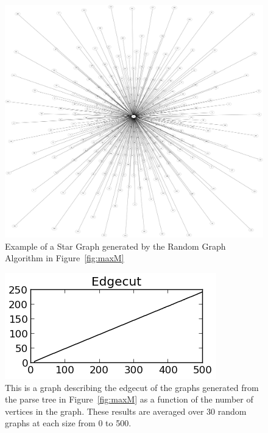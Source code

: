\documentclass{article}
\begin{document}
\begin{figure}
\begin{centering}
  \includegraphics[scale=0.1]{starGraph.png}
  \caption{Example of a Star Graph generated by the Random Graph Algorithm in Figure~\ref{fig:maxM}}
  \label{fig:starGraph}
\end{centering}
\end{figure}

\begin{figure}
\begin{centering}
  \includegraphics[scale=1]{maxM5-Edgecut.png}
  \caption{This is a graph describing the edgecut of the graphs generated from the parse tree in Figure~\ref{fig:maxM} as a function of the number of vertices in the graph. 
    These results are averaged over 30 random graphs at each size from 0 to 500.}
  \label{fig:maxM-graph}
\end{centering}
\end{figure}
\end{document}

